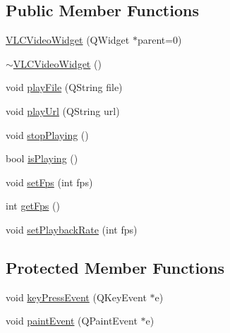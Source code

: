 \subsection*{Public Member Functions}
\begin{DoxyCompactItemize}
\item 
\hyperlink{classVLCVideoWidget_a2ee422ecbf1d7c6a09c8c08461ae8f0d}{V\-L\-C\-Video\-Widget} (Q\-Widget $\ast$parent=0)
\item 
\hyperlink{classVLCVideoWidget_a2ad9c4a037fdb833b1b1f9ba71075d86}{$\sim$\-V\-L\-C\-Video\-Widget} ()
\item 
void \hyperlink{classVLCVideoWidget_a7eb5395abd53f19c012fea779b6bac1e}{play\-File} (Q\-String file)
\item 
void \hyperlink{classVLCVideoWidget_a1119aa3a41789fc1f4abe834e36c64df}{play\-Url} (Q\-String url)
\item 
void \hyperlink{classVLCVideoWidget_aefa842a30cbb11522428597c1f0608a0}{stop\-Playing} ()
\item 
bool \hyperlink{classVLCVideoWidget_a45fd49c0a63d1eeeaaff78ffd208ddad}{is\-Playing} ()
\item 
void \hyperlink{classVLCVideoWidget_a5fce57e1a69fd7371c7e0950d5bb14a8}{set\-Fps} (int fps)
\item 
int \hyperlink{classVLCVideoWidget_ac80ca2be7b8f96631f32827ab06e70a1}{get\-Fps} ()
\item 
void \hyperlink{classVLCVideoWidget_aff2bdf48d08757e6b86aa5f21eb43fb5}{set\-Playback\-Rate} (int fps)
\end{DoxyCompactItemize}
\subsection*{Protected Member Functions}
\begin{DoxyCompactItemize}
\item 
void \hyperlink{classVLCVideoWidget_ae6a2d91395f32ad7c80fb1839557da4f}{key\-Press\-Event} (Q\-Key\-Event $\ast$e)
\item 
void \hyperlink{classVLCVideoWidget_a2fb0969c2a4efa024038ce1e1cfe1e64}{paint\-Event} (Q\-Paint\-Event $\ast$e)
\end{DoxyCompactItemize}


